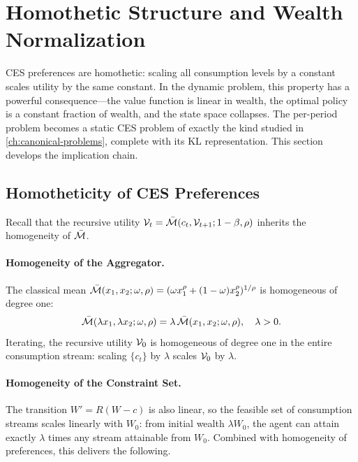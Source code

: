 \section{Homothetic Structure and Wealth Normalization}
\label{sec:dp-homothetic}

CES preferences are homothetic: scaling all consumption levels by a constant scales utility by the same constant. In the dynamic problem, this property has a powerful consequence---the value function is linear in wealth, the optimal policy is a constant fraction of wealth, and the state space collapses. The per-period problem becomes a static CES problem of exactly the kind studied in \cref{ch:canonical-problems}, complete with its KL representation. This section develops the implication chain.

\subsection{Homotheticity of CES Preferences}
\label{subsec:dp-homotheticity}

Recall that the recursive utility $\mathcal{V}_t = \bar{\mathcal{M}}(c_t, \mathcal{V}_{t+1}; 1-\beta, \rho)$ inherits the homogeneity of $\bar{\mathcal{M}}$.

\paragraph{Homogeneity of the Aggregator.}
The classical mean $\bar{\mathcal{M}}(x_1, x_2; \omega, \rho) = (\omega x_1^\rho + (1-\omega) x_2^\rho)^{1/\rho}$ is homogeneous of degree one:
\begin{equation}
\bar{\mathcal{M}}(\lambda x_1, \lambda x_2; \omega, \rho) = \lambda \, \bar{\mathcal{M}}(x_1, x_2; \omega, \rho), \quad \lambda > 0.
\label{eq:mbar-homogeneous}
\end{equation}
Iterating, the recursive utility $\mathcal{V}_0$ is homogeneous of degree one in the entire consumption stream: scaling $\{c_t\}$ by $\lambda$ scales $\mathcal{V}_0$ by $\lambda$.

\paragraph{Homogeneity of the Constraint Set.}
The transition $W' = R(W - c)$ is also linear, so the feasible set of consumption streams scales linearly with $W_0$: from initial wealth $\lambda W_0$, the agent can attain exactly $\lambda$ times any stream attainable from $W_0$. Combined with homogeneity of preferences, this delivers the following.

